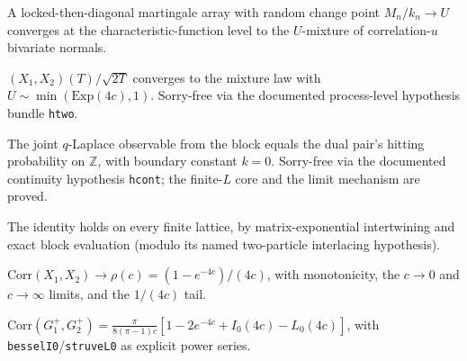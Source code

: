 \begin{theorem}\label{thm:twophase-abs}
  \leanok
  A locked-then-diagonal martingale array with random change point
  $M_n/k_n \to U$ converges at the characteristic-function level to the
  $U$-mixture of correlation-$u$ bivariate normals.
\end{theorem}

\begin{proposition}\label{prop:twophase}
  \leanok
  $(X_1,X_2)(T)/\sqrt{2T}$ converges to the mixture law with
  $U \sim \min(\mathrm{Exp}(4c),1)$.  Sorry-free via the documented process-level
  hypothesis bundle \texttt{htwo}.
\end{proposition}

\begin{lemma}\label{lem:crossbridge}
  \leanok
  The joint $q$-Laplace observable from the block equals the dual pair's hitting
  probability on $\mathbb Z$, with boundary constant $k=0$.  Sorry-free via the
  documented continuity hypothesis \texttt{hcont}; the finite-$L$ core and the limit
  mechanism are proved.
\end{lemma}

\begin{lemma}\label{lem:crossbridge-finiteL}
  \leanok
  The identity holds on every finite lattice, by matrix-exponential intertwining
  and exact block evaluation (modulo its named two-particle interlacing hypothesis).
\end{lemma}

\begin{theorem}\label{thm:closed}
  \leanok
  $\mathrm{Corr}(X_1,X_2) \to \rho(c) = (1-e^{-4c})/(4c)$, with monotonicity, the
  $c\to0$ and $c\to\infty$ limits, and the $1/(4c)$ tail.
\end{theorem}

\begin{proposition}\label{prop:struve}
  \leanok
  $\mathrm{Corr}(G_1^+,G_2^+) = \frac{\pi}{8(\pi-1)c}[1-2e^{-4c}+I_0(4c)-L_0(4c)]$,
  with \texttt{besselI0}/\texttt{struveL0} as explicit power series.
\end{proposition}

